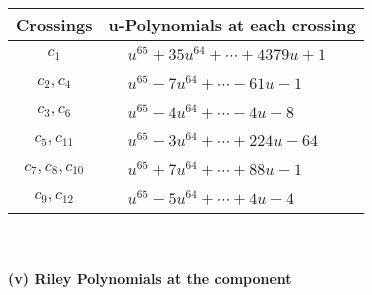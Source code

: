 \documentclass[1p]{elsarticle_modified}
\theoremstyle{definition}
\begin{document}
\begin{tabular}{m{50pt}|m{274pt}}
Crossings & \hspace{64pt}u-Polynomials at each crossing \\
\hline $$\begin{aligned}c_{1}\end{aligned}$$&$\begin{aligned}
&u^{65}+35 u^{64}+\cdots+4379 u+1
\end{aligned}$\\
\hline $$\begin{aligned}c_{2},c_{4}\end{aligned}$$&$\begin{aligned}
&u^{65}-7 u^{64}+\cdots-61 u-1
\end{aligned}$\\
\hline $$\begin{aligned}c_{3},c_{6}\end{aligned}$$&$\begin{aligned}
&u^{65}-4 u^{64}+\cdots-4 u-8
\end{aligned}$\\
\hline $$\begin{aligned}c_{5},c_{11}\end{aligned}$$&$\begin{aligned}
&u^{65}-3 u^{64}+\cdots+224 u-64
\end{aligned}$\\
\hline $$\begin{aligned}c_{7},c_{8},c_{10}\end{aligned}$$&$\begin{aligned}
&u^{65}+7 u^{64}+\cdots+88 u-1
\end{aligned}$\\
\hline $$\begin{aligned}c_{9},c_{12}\end{aligned}$$&$\begin{aligned}
&u^{65}-5 u^{64}+\cdots+4 u-4
\end{aligned}$\\
\hline
\end{tabular}\\~\\
\newpage\renewcommand{\arraystretch}{1}
\flushleft \textbf{(v) Riley Polynomials at the component}\newline \\
\end{document}
